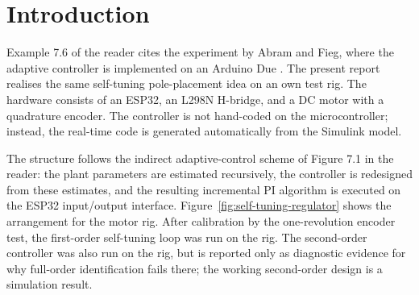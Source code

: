 \section{Introduction}

Example 7.6 of the reader cites the experiment by Abram and Fieg, where the
adaptive controller is implemented on an Arduino Due \cite{ravazzoloMehrle2026,abramFieg}.
The present report realises the same self-tuning pole-placement idea on an
own test rig. The hardware consists of an ESP32, an L298N H-bridge, and a DC
motor with a quadrature encoder. The controller is not hand-coded on the
microcontroller; instead, the real-time code is generated automatically from
the Simulink model.

The structure follows the indirect adaptive-control scheme of Figure 7.1 in
the reader: the plant parameters are estimated recursively, the controller is
redesigned from these estimates, and the resulting incremental PI algorithm is
executed on the ESP32 input/output interface.
Figure~\ref{fig:self-tuning-regulator} shows the arrangement for the motor
rig. After calibration by the one-revolution encoder test, the first-order
self-tuning loop was run on the rig. The second-order controller was also run
on the rig, but is reported only as diagnostic evidence for why full-order
identification fails there; the working second-order design is a simulation
result.

